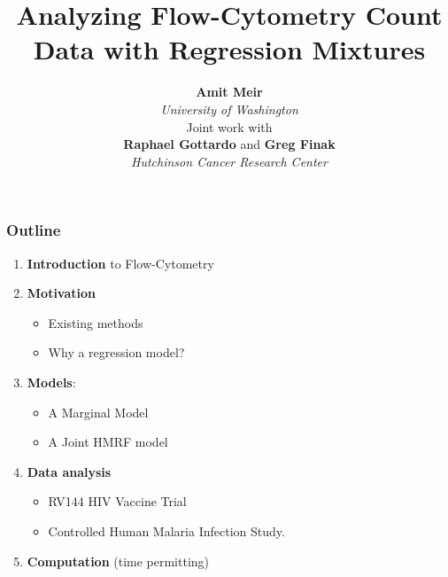 \documentclass{beamer}
\theoremstyle{definition}
\begin{document}
\title{\LARGE{Analyzing Flow-Cytometry Count Data with Regression Mixtures}}

\author{\large{\textbf{Amit Meir}} \\ \emph{University of Washington} \\ \vspace{1 cm} Joint work with \\ \vspace{0.1 cm} \textbf{Raphael Gottardo} and \textbf{Greg Finak} 
\\ \emph{Hutchinson Cancer Research Center}}


\vspace{1 cm}


\begin{frame}[plain]
  \titlepage
\end{frame}



\begin{frame}
\frametitle{Outline}
\begin{enumerate}
\item \textbf{Introduction} to Flow-Cytometry
\vspace{0.3 cm}
\item \textbf{Motivation}
	\begin{itemize}
	\item Existing methods
	\item Why a regression model?
	\end{itemize}
\vspace{0.3 cm}
\item \textbf{Models}:
	\begin{itemize}
	\item A Marginal Model
	\item A Joint HMRF model
	\end{itemize}
	\vspace{0.3 cm}
\item \textbf{Data analysis}
	\begin{itemize}
	\item RV144 HIV Vaccine Trial
	\item Controlled Human Malaria Infection Study.
	\end{itemize}

\vspace{0.3 cm}
\item  \textbf{Computation} (time permitting)
\end{enumerate}
\end{frame}
\end{document}
